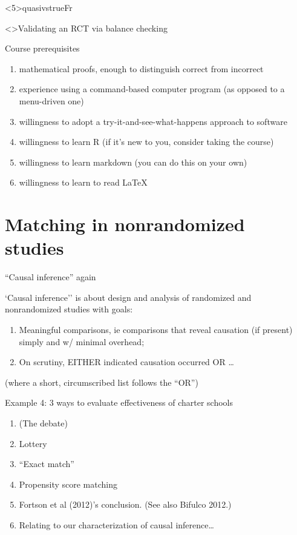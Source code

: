 \againframe<5\mynoteonly>{quasivstrueFr}

\begin{frame}<\nottheirhandout>{Validating an RCT via balance checking}
  \begin{center}
  \end{center}
\end{frame}

\begin{frame}{Course prerequisites}
  \begin{enumerate}
  \item mathematical proofs, enough to distinguish correct from incorrect 
\item experience using a command-based computer program (as opposed to a menu-driven one)
\item willingness to adopt a try-it-and-see-what-happens approach to software
\item willingness to learn R  (if it's new to you, consider taking the course)
\item willingness to learn markdown (you can do this on your own)
\item willingness to learn to read LaTeX

  \end{enumerate}
\end{frame}


\section{Matching in nonrandomized studies}

\begin{frame}[label=CIFr]{``Causal inference'' again}

`Causal inference'' is about design and analysis of randomized and
nonrandomized studies with goals:
\begin{enumerate}
\item Meaningful comparisons, ie comparisons that reveal causation (if present) simply and w/ minimal overhead;
\item On scrutiny, EITHER indicated causation occurred OR \ldots
\end{enumerate}


(where a short, circumscribed list follows the ``OR'')

\end{frame}

\begin{frame}{Example 4: 3 ways to evaluate effectiveness of charter schools }

\begin{enumerate}
\item (The debate)
\item Lottery
\item ``Exact match''
\item Propensity score matching
\item Fortson et al (2012)'s conclusion. (See also Bifulco 2012.)
\item Relating to our characterization of causal inference\ldots
\end{enumerate}
\end{frame}

